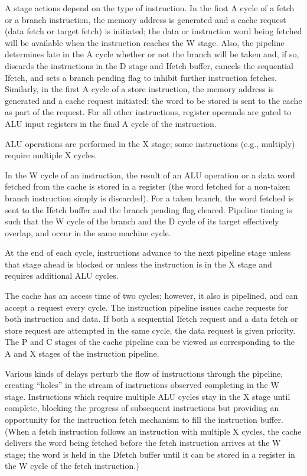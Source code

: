 A stage actions depend on the type of instruction. In the first A cycle of a
fetch or a branch instruction, the memory address is generated and a cache
request (data fetch or target fetch) is initiated; the data or instruction word
being fetched will be available when the instruction reaches the W stage.
Also, the pipeline determines late in the A cycle whether or not the branch
will be taken and, if so, discards the instructions in the D stage and Ifetch
buffer, cancels the sequential Ifetch, and sets a branch pending flag to inhibit
further instruction fetches. Similarly, in the first A cycle of a store instruction,
the memory address is generated and a cache request initiated: the
word to be stored is sent to the cache as part of the request. For all other
instructions, register operands are gated to ALU input registers in the final A
cycle of the instruction.

ALU operations are performed in the X stage; some instructions (e.g.,
multiply) require multiple X cycles.

In the W cycle of an instruction, the result of an ALU operation or a data
word fetched from the cache is stored in a register (the word fetched for a
non-taken branch instruction simply is discarded). For a taken branch, the
word fetched is sent to the Ifetch buffer and the branch pending flag cleared.
Pipeline timing is such that the W cycle of the branch and the D cycle of its
target effectively overlap, and occur in the same machine cycle.

At the end of each cycle, instructions advance to the next pipeline stage
unless that stage ahead is blocked or unless the instruction is in the X stage
and requires additional ALU cycles.

The cache has an access time of two cycles; however, it also is pipelined,
and can accept a request every cycle. The instruction pipeline issues cache
requests for both instruction and data. If both a sequential Ifetch request and
a data fetch or store request are attempted in the same cycle, the data
request is given priority. The P and C stages of the cache pipeline can be
viewed as corresponding to the A and X stages of the instruction pipeline.

Various kinds of delays perturb the flow of instructions through the
pipeline, creating ``holes'' in the stream of instructions observed completing
in the W stage. Instructions which require multiple ALU cycles stay in the X
stage until complete, blocking the progress of subsequent instructions but
providing an opportunity for the instruction fetch mechanism to fill the
instruction buffer. (When a fetch instruction follows an instruction with
multiple X cycles, the cache delivers the word being fetched before the fetch
instruction arrives at the W stage; the word is held in the Dfetch buffer
until it can be stored in a register in the W cycle of the fetch instruction.)

